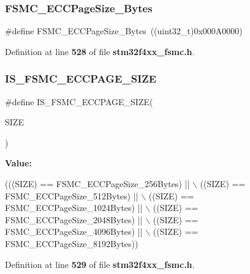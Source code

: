 \subsubsection{F\+S\+M\+C\+\_\+\+E\+C\+C\+Page\+Size\+\_\+Bytes}
{\footnotesize\ttfamily \#define F\+S\+M\+C\+\_\+\+E\+C\+C\+Page\+Size\+\_\+Bytes~((uint32\+\_\+t)0x000\+A0000)}



Definition at line \textbf{ 528} of file \textbf{ stm32f4xx\+\_\+fsmc.\+h}.

\mbox{\label{group__FSMC__ECC__Page__Size_ga58fefa0d55875775a88f54ad7498178f}} 
\subsubsection{I\+S\+\_\+\+F\+S\+M\+C\+\_\+\+E\+C\+C\+P\+A\+G\+E\+\_\+\+S\+I\+ZE}
{\footnotesize\ttfamily \#define I\+S\+\_\+\+F\+S\+M\+C\+\_\+\+E\+C\+C\+P\+A\+G\+E\+\_\+\+S\+I\+ZE(\begin{DoxyParamCaption}\item[{}]{S\+I\+ZE }\end{DoxyParamCaption})}

{\bfseries Value\+:}
\begin{DoxyCode}
(((SIZE) == FSMC_ECCPageSize_256Bytes) || \(\backslash\)
                                    ((SIZE) == FSMC_ECCPageSize_512Bytes) || \(\backslash\)
                                    ((SIZE) == FSMC_ECCPageSize_1024Bytes) || \(\backslash\)
                                    ((SIZE) == FSMC_ECCPageSize_2048Bytes) || \(\backslash\)
                                    ((SIZE) == FSMC_ECCPageSize_4096Bytes) || \(\backslash\)
                                    ((SIZE) == FSMC_ECCPageSize_8192Bytes))
\end{DoxyCode}


Definition at line \textbf{ 529} of file \textbf{ stm32f4xx\+\_\+fsmc.\+h}.

